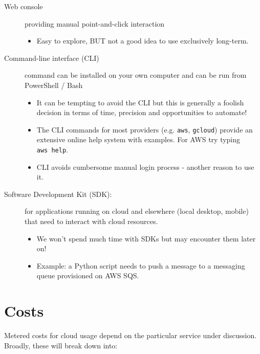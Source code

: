 \begin{description}
\item[Web console]
providing manual point-and-click interaction

\begin{itemize}

\item
  Easy to explore, BUT not a good idea to use exclusively long-term.
\end{itemize}
\item[Command-line interface (CLI)]
command can be installed on your own computer and can be run from
PowerShell / Bash

\begin{itemize}
\item
  It can be tempting to avoid the CLI but this is generally a foolish
  decision in terms of time, precision and opportunities to automate!
\item
  The CLI commands for most providers (e.g. \texttt{aws},
  \texttt{gcloud}) provide an extensive online help system with
  examples. For AWS try typing \texttt{aws\ help}.
\item
  CLI avoids cumbersome manual login process - another reason to use it.
\end{itemize}
\item[Software Development Kit (SDK):]
for applications running on cloud and elsewhere (local desktop, mobile)
that need to interact with cloud resources.

\begin{itemize}
\item
  We won't spend much time with SDKs but may encounter them later on!
\item
  Example: a Python script needs to push a message to a messaging queue
  provisioned on AWS SQS.
\end{itemize}
\end{description}

\section{Costs}
\label{sec:costs}

Metered costs for cloud usage depend on the particular service under
discussion. Broadly, these will break down into:

